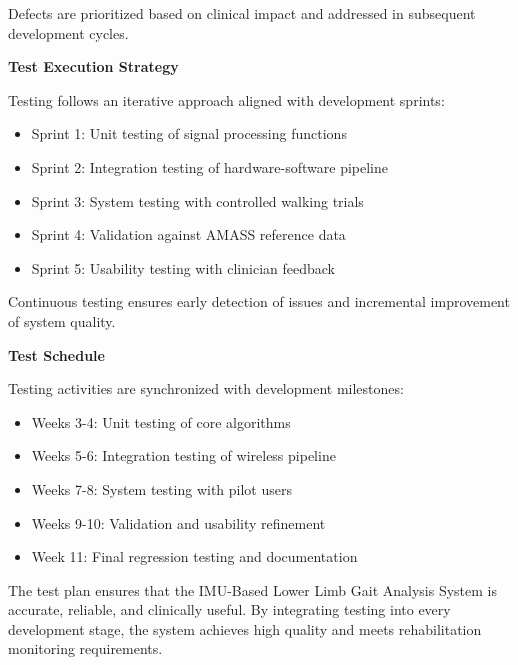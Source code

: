 \documentclass[12pt,a4paper]{report}
\begin{document}
Defects are prioritized based on clinical impact and addressed in subsequent development cycles.

\textbf{Test Execution Strategy}

Testing follows an iterative approach aligned with development sprints:
\begin{itemize}
    \item Sprint 1: Unit testing of signal processing functions
    \item Sprint 2: Integration testing of hardware-software pipeline
    \item Sprint 3: System testing with controlled walking trials
    \item Sprint 4: Validation against AMASS reference data
    \item Sprint 5: Usability testing with clinician feedback
\end{itemize}

Continuous testing ensures early detection of issues and incremental improvement of system quality.

\textbf{Test Schedule}

Testing activities are synchronized with development milestones:

\begin{itemize}
    \item Weeks 3-4: Unit testing of core algorithms
    \item Weeks 5-6: Integration testing of wireless pipeline
    \item Weeks 7-8: System testing with pilot users
    \item Weeks 9-10: Validation and usability refinement
    \item Week 11: Final regression testing and documentation
\end{itemize}

The test plan ensures that the IMU-Based Lower Limb Gait Analysis System is accurate, reliable, and clinically useful. By integrating testing into every development stage, the system achieves high quality and meets rehabilitation monitoring requirements.

\setcounter{chapter}{6}
\clearpage
\thispagestyle{empty}

\noindent
{}
\end{document}

